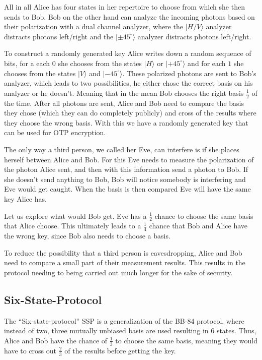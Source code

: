\documentclass[a4paper]{article}
\begin{document}
All in all Alice has four states in her repertoire to choose from which
she then sends to Bob. Bob on the other hand can analyze the incoming photons
based on their polarization with a dual channel analyzer, where the $|H/V\rangle$
analyzer distracts photons left/right and the $|\pm45^\circ\rangle$ analyzer distracts
photons left/right.

To construct a randomly generated key Alice writes down
a random sequence of bits, for a each $0$ she chooses from the states $|H\rangle$ or
$|+45^\circ\rangle$ and for each $1$ she chooses from the states $|V\rangle$
and $|-45^\circ\rangle$. These polarized photons are sent to Bob's analyzer,
which leads to two possibilities, he either chose the correct basis on his
analyzer or he doesn't. Meaning that in the mean Bob chooses the right basis
$\frac{1}{2}$ of the time. After all photons are sent, Alice and Bob need to compare
the basis they chose (which they can do completely publicly) and cross of the
results where they choose the wrong basis. With this we have a randomly
generated key that can be used for OTP encryption.

The only way a third person, we called her Eve, can interfere is if she places
herself between Alice and Bob. For this Eve needs to measure the polarization
of the photon Alice sent, and then with this information send a photon to Bob.
If she doesn't send anything to Bob, Bob will notice somebody is interfering
and Eve would get caught. When the basis is then compared Eve will have the
same key Alice has.

Let us explore what would Bob get. Eve has a $\frac{1}{2}$ chance to choose the
same basis that Alice choose. This ultimately leads to a $\frac{1}{4}$ chance that Bob
and Alice have the wrong key, since Bob also needs to choose a basis.

To reduce the possibility that a third person is eavesdropping, Alice and Bob
need to compare a small part of their measurement results. This results in the
protocol needing to being carried out much longer for the sake of security.

\subsection{Six-State-Protocol}
The ``Six-state-protocol'' SSP is a generalization of the BB-84 protocol, where
instead of two, three mutually unbiased basis are used resulting in 6 states.
Thus, Alice and Bob have the chance of $\frac{1}{3}$ to choose the same basis,
meaning they would have to cross out $\frac{2}{3}$ of the results before
getting the key.
\end{document}
